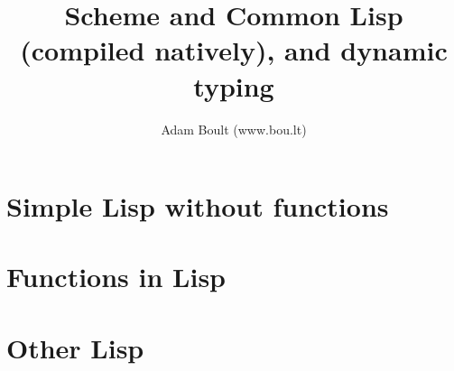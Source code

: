 \documentclass[oneside]{book}
\begin{document}
\author{Adam Boult (www.bou.lt)}
\title{Scheme and Common Lisp (compiled natively), and dynamic typing}
\maketitle

\setcounter{tocdepth}{0}
\tableofcontents



\part{Simple Lisp without functions}





\part{Functions in Lisp}

\part{Other Lisp}
\end{document}
